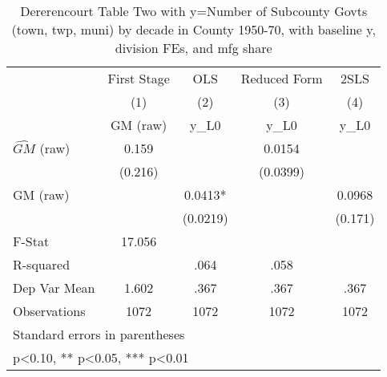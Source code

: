 \begin{table}[htbp]\centering
\def\sym#1{\ifmmode^{#1}\else\(^{#1}\)\fi}
\caption{Dererencourt Table Two with y=Number of Subcounty Govts (town, twp, muni) by decade in County 1950-70, with baseline y, division FEs, and mfg share}
\begin{tabular}{l*{4}{c}}
\toprule
                    & First Stage   &         OLS   &Reduced Form   &        2SLS   \\
                    &\multicolumn{1}{c}{(1)}&\multicolumn{1}{c}{(2)}&\multicolumn{1}{c}{(3)}&\multicolumn{1}{c}{(4)}\\
                    &\multicolumn{1}{c}{GM  (raw)}&\multicolumn{1}{c}{y\_L0}&\multicolumn{1}{c}{y\_L0}&\multicolumn{1}{c}{y\_L0}\\
\midrule
$\hat{GM}$ (raw)    &       0.159   &               &      0.0154   &               \\
                    &     (0.216)   &               &    (0.0399)   &               \\
\addlinespace
GM  (raw)           &               &      0.0413*  &               &      0.0968   \\
                    &               &    (0.0219)   &               &     (0.171)   \\
\midrule
F-Stat              &      17.056   &               &               &               \\
R-squared           &               &        .064   &        .058   &               \\
Dep Var Mean        &       1.602   &        .367   &        .367   &        .367   \\
Observations        &        1072   &        1072   &        1072   &        1072   \\
\bottomrule
\multicolumn{5}{l}{\footnotesize Standard errors in parentheses}\\
\multicolumn{5}{l}{\footnotesize * p<0.10, ** p<0.05, *** p<0.01}\\
\end{tabular}
\end{table}
